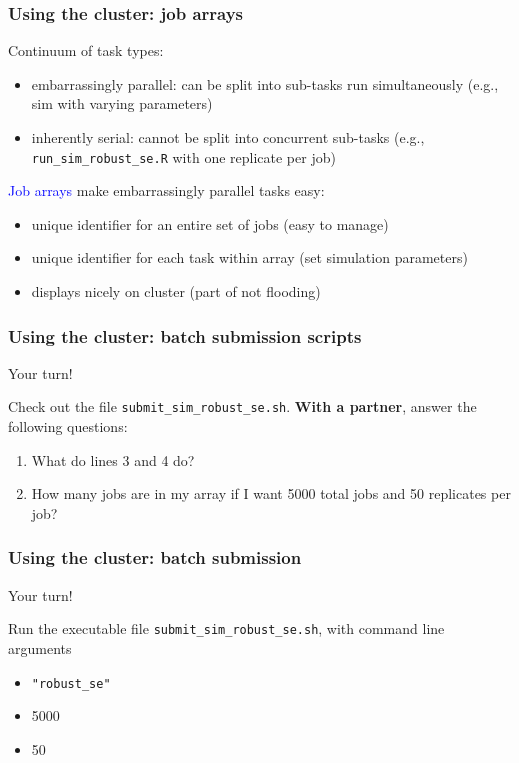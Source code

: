 \documentclass[12pt, 
hyperref={colorlinks=true, linkcolor=BlueViolet, urlcolor=BlueViolet},dvipsnames]{beamer}
\begin{document}
\begin{frame}
\frametitle{Using the cluster: job arrays}

Continuum of task types: \vspace{-0.3cm} \pause
\begin{itemize}
\item embarrassingly parallel: \pause can be split into sub-tasks run simultaneously \pause (e.g., sim with varying parameters)
\item inherently serial: \pause cannot be split into concurrent sub-tasks \pause (e.g., \texttt{run\_sim\_robust\_se.R} with one replicate per job) \pause
\end{itemize}

\textcolor{blue}{Job arrays} make embarrassingly parallel tasks easy: \vspace{-0.3cm} \pause
\begin{itemize}
\item unique identifier for an entire set of jobs \pause (easy to manage) \pause
\item unique identifier for each task within array \pause (set simulation parameters) \pause
\item displays nicely on cluster \pause (part of not flooding) 
\end{itemize}
\end{frame}

\begin{frame}
\frametitle{Using the cluster: batch submission scripts}

Your turn!

Check out the file \texttt{submit\_sim\_robust\_se.sh}. \textbf{With a partner}, answer the following questions: \vspace{-0.3cm}
\begin{enumerate}
\item What do lines 3 and 4 do? 
\item How many jobs are in my array if I want 5000 total jobs and 50 replicates per job?
\end{enumerate}

\end{frame}

\begin{frame}
\frametitle{Using the cluster: batch submission}

Your turn! 

Run the executable file \texttt{submit\_sim\_robust\_se.sh}, with command line arguments \vspace{-0.3cm}
\begin{itemize}
\item \texttt{"robust\_se"}
\item 5000
\item 50
\end{itemize}
\end{frame}
\end{document}

